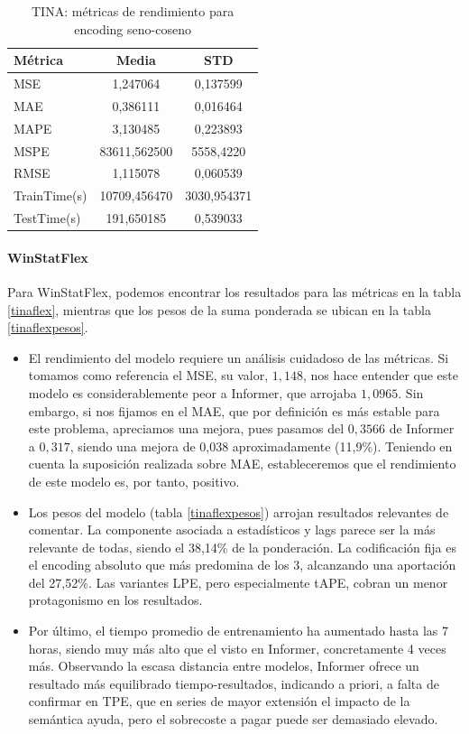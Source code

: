 \begin{table}[!ht]
	\centering
	\begin{tabular}{l|c|c}
		\toprule
		Métrica & Media & STD \\
		\midrule
		MSE & 1,247064 & 0,137599 \\
		MAE & 0,386111 & 0,016464 \\
		MAPE & 3,130485 & 0,223893 \\
		MSPE & 83611,562500 & 5558,4220 \\
		RMSE & 1,115078 & 0,060539 \\
		TrainTime(s) & 10709,456470 & 3030,954371 \\
		TestTime(s) & 191,650185 & 0,539033 \\
		\bottomrule
	\end{tabular}
	\caption{TINA: métricas de rendimiento para encoding seno-coseno}
	\label{tinasincos}
\end{table}

\paragraph{WinStatFlex}

Para WinStatFlex, podemos encontrar los resultados para las métricas en la tabla \ref{tinaflex}, mientras que los pesos de la suma ponderada se ubican en la tabla \ref{tinaflexpesos}.

\begin{itemize}
	\item El rendimiento del modelo requiere un análisis cuidadoso de las métricas. Si tomamos como referencia el MSE, su valor, $1,148$, nos hace entender que este modelo es considerablemente peor a Informer, que arrojaba $1,0965$. Sin embargo, si nos fijamos en el MAE, que por definición es más estable para este problema, apreciamos una mejora, pues pasamos del $0,3566$ de Informer a $0,317$, siendo una mejora de 0,038 aproximadamente (11,9\%). Teniendo en cuenta la suposición realizada sobre MAE, estableceremos que el rendimiento de este modelo es, por tanto, positivo.
	
	\item Los pesos del modelo (tabla \ref{tinaflexpesos}) arrojan resultados relevantes de comentar. La componente asociada a estadísticos y lags parece ser la más relevante de todas, siendo el 38,14\% de la ponderación. La codificación fija es el encoding absoluto que más predomina de los 3, alcanzando una aportación del 27,52\%. Las variantes LPE, pero especialmente tAPE, cobran un menor protagonismo en los resultados.
	
	\item Por último, el tiempo promedio de entrenamiento ha aumentado hasta las 7 horas, siendo muy más alto que el visto en Informer, concretamente 4 veces más. Observando la escasa distancia entre modelos, Informer ofrece un resultado más equilibrado tiempo-resultados, indicando a priori, a falta de confirmar en TPE, que en series de mayor extensión el impacto de la semántica ayuda, pero el sobrecoste a pagar puede ser demasiado elevado.
\end{itemize}
 

